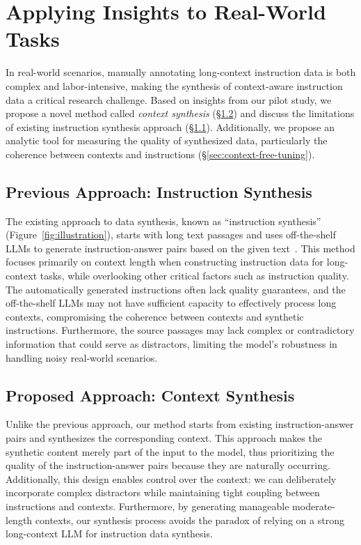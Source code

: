 \section{Applying Insights to Real-World Tasks}
In real-world scenarios, manually annotating long-context instruction data is both complex and labor-intensive, making the synthesis of context-aware instruction data a critical research challenge.
Based on insights from our pilot study, we propose a novel method called \textit{context synthesis} (\S\ref{sec:context}) and discuss the limitations of existing instruction synthesis approach (\S\ref{sec:instruction}).
Additionally, we propose an analytic tool for measuring the quality of synthesized data, particularly the coherence between contexts and instructions (\S\ref{sec:context-free-tuning}).

\subsection{Previous Approach: Instruction Synthesis}
\label{sec:instruction}
The existing approach to data synthesis, known as ``instruction synthesis'' (Figure~\ref{fig:illustration}), starts with long text passages and uses off-the-shelf LLMs to generate instruction-answer pairs based on the given text~\cite{bai2024longalign}.
This method focuses primarily on context length when constructing instruction data for long-context tasks, while overlooking other critical factors such as instruction quality. 
The automatically generated instructions often lack quality guarantees, and the off-the-shelf LLMs may not have sufficient capacity to effectively process long contexts, compromising the coherence between contexts and synthetic instructions.
Furthermore, the source passages may lack complex or contradictory information that could serve as distractors, limiting the model's robustness in handling noisy real-world scenarios.

\subsection{Proposed Approach: Context Synthesis}
\label{sec:context}
Unlike the previous approach, our method starts from existing instruction-answer pairs and synthesizes the corresponding context.
This approach makes the synthetic content merely part of the input to the model, 
thus prioritizing the quality of the instruction-answer pairs because they are naturally occurring. 
Additionally, this design enables control over the context: we can deliberately incorporate complex distractors while maintaining tight coupling between instructions and contexts.
Furthermore, by generating manageable moderate-length contexts, our synthesis process avoids the paradox of relying on a strong long-context LLM for instruction data synthesis.

